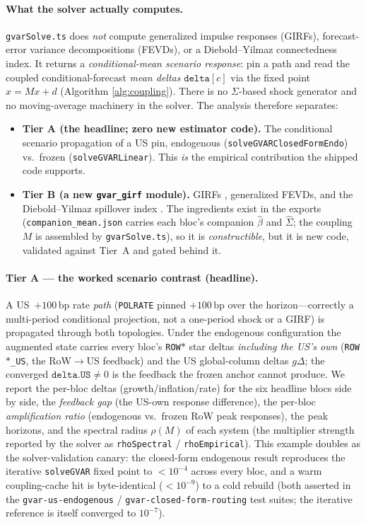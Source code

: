 \documentclass[11pt]{article}
\theoremstyle{definition}
\theoremstyle{remark}
\begin{document}
\paragraph{What the solver actually computes.} \texttt{gvarSolve.ts} does
\emph{not} compute generalized impulse responses (GIRFs), forecast-error
variance decompositions (FEVDs), or a Diebold--Yilmaz connectedness
index. It returns a \emph{conditional-mean scenario response}: pin a path
and read the coupled conditional-forecast \emph{mean deltas}
$\texttt{delta}[c]$ via the fixed point $x=Mx+d$ (Algorithm
\ref{alg:coupling}). There is no $\Sigma$-based shock generator and no
moving-average machinery in the solver. The analysis therefore separates:
\begin{itemize}
  \item \textbf{Tier A (the headline; zero new estimator code).} The
    conditional scenario propagation of a US pin, endogenous
    (\texttt{solveGVARClosedFormEndo}) vs.\ frozen
    (\texttt{solveGVARLinear}). This \emph{is} the empirical contribution
    the shipped code supports.
  \item \textbf{Tier B (a new \texttt{gvar\_girf} module).} GIRFs
    \citep{PesaranShin1998}, generalized FEVDs, and the Diebold--Yilmaz
    spillover index \citep{DieboldYilmaz2009,DieboldYilmaz2012}. The
    ingredients exist in the exports (\texttt{companion\_mean.json}
    carries each bloc's companion $\hat\beta$ and $\hat\Sigma$; the
    coupling $M$ is assembled by \texttt{gvarSolve.ts}), so it is
    \emph{constructible}, but it is new code, validated against Tier~A and
    gated behind it.
\end{itemize}

\paragraph{Tier A --- the worked scenario contrast (headline).} A
US~$+100$\,bp rate \emph{path} (\texttt{POLRATE} pinned $+100$\,bp over
the horizon---correctly a multi-period conditional projection, not a
one-period shock or a GIRF) is propagated through both topologies. Under
the endogenous configuration the augmented state carries every bloc's
\texttt{ROW$*$} star deltas \emph{including the US's own}
(\texttt{ROW$*$\_US}, the RoW$\to$US feedback) and the US global-column
deltas $g\Delta$; the converged $\texttt{delta.US}\neq0$ is the feedback
the frozen anchor cannot produce. We report the per-bloc deltas
(growth/inflation/rate) for the six headline blocs side by side, the
\emph{feedback gap} (the US-own response difference), the per-bloc
\emph{amplification ratio} (endogenous vs.\ frozen RoW peak responses),
the peak horizons, and the spectral radius $\rho(M)$ of each system (the
multiplier strength reported by the solver as \texttt{rhoSpectral} /
\texttt{rhoEmpirical}). This example doubles as the solver-validation
canary: the closed-form endogenous result reproduces the iterative
\texttt{solveGVAR} fixed point to $<10^{-4}$ across every bloc, and a
warm coupling-cache hit is byte-identical ($<10^{-9}$) to a cold rebuild
(both asserted in the \texttt{gvar-us-endogenous} / \texttt{gvar-closed-form-routing}
test suites; the iterative reference is itself converged to $10^{-7}$).
\end{document}

